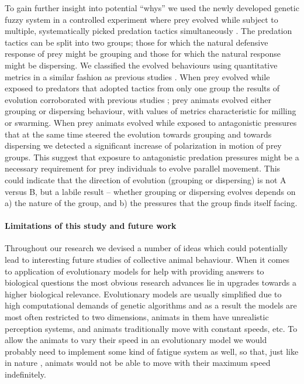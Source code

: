 To gain further insight into potential ``whys'' we used the newly developed genetic fuzzy system in a controlled experiment where prey evolved while subject to multiple, systematically picked predation tactics simultaneously \cite{demsar2016balanced}. The predation tactics can be split into two groups; those for which the natural defensive response of prey might be grouping and those for which the natural response might be dispersing. We classified the evolved behaviours using quantitative metrics in a similar fashion as previous studies \cite{couzin2002collective,vicsek2012collective,tunstrom2013collective}. When prey evolved while exposed to predators that adopted tactics from only one group the results of evolution corroborated with previous studies \cite{biswas2014causes,olson2013predator,olson2016evolution,wood2007evolving}; prey animats evolved either grouping or dispersing behaviour, with values of metrics characteristic for milling or swarming. When prey animats evolved while exposed to antagonistic pressures that at the same time steered the evolution towards grouping and towards dispersing we detected a significant increase of polarization in motion of prey groups. This suggest that exposure to antagonistic predation pressures might be a necessary requirement for prey individuals to evolve parallel movement. This could indicate that the direction of evolution (grouping or dispersing) is not A versus B, but a labile result -- whether grouping or dispersing evolves depends on a) the nature of the group, and b) the pressures that the group finds itself facing.

\paragraph{Limitations of this study and future work} Throughout our research we devised a number of ideas which could potentially lead to interesting future studies of collective animal behaviour. When it comes to application of evolutionary models for help with providing answers to biological questions the most obvious research advances lie in upgrades towards a higher biological relevance. Evolutionary models are usually simplified due to high computational demands of genetic algorithms and as a result the models are most often restricted to two dimensions, animats in them have unrealistic perception systems, and animats traditionally move with constant speeds, etc. To allow the animats to vary their speed in an evolutionary model we would probably need to implement some kind of fatigue system as well, so that, just like in nature \cite{norin2016measurement,roche2013finding}, animats would not be able to move with their maximum speed indefinitely. 

